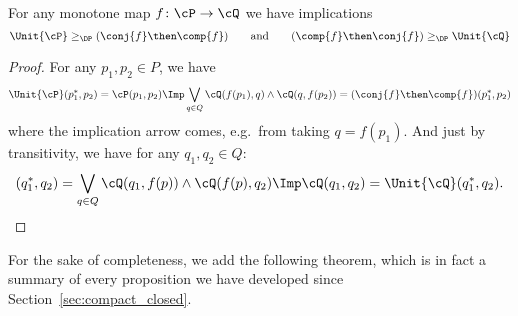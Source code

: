 \begin{proposition}\label{prop:comp_conj_adj}
For any monotone map $f\colon\cP \to\cQ $ we have implications
\begin{equation}
\Unit{\cP }\geq_\DP (\conj{f}\then \comp{f})
\qquad\text{and}\qquad
(\comp{f}\then \conj{f})\geq_\DP \Unit{\cQ }
\end{equation}
\end{proposition}
\begin{proof}
For any $p_1,p_2\in P$, we have
\begin{equation*}
	\Unit{\cP }(p_1^*,p_2)=\cP (p_1,p_2)
	\Imp\bigvee_{q\in Q}\cQ (f(p_1),q)\wedge\cQ (q,f(p_2))=(\conj{f}\then \comp{f})(p_1^*,p_2)
\end{equation*}
where the implication arrow comes, e.g.\ from taking $q=f(p_1)$. And just by transitivity, we have for any $q_1,q_2\in Q$:
\begin{equation*}
	[\comp{f}\then \conj{f}](q_1^*,q_2)=\bigvee_{q\in Q}\cQ (q_1,f(p))\wedge\cQ (f(p),q_2)
	\Imp\cQ (q_1,q_2)=\Unit{\cQ }(q_1^*,q_2).\qedhere
\end{equation*}
\end{proof}

For the sake of completeness, we add the following theorem, which is in fact a summary of every proposition we have developed since Section~\ref{sec:compact_closed}.

